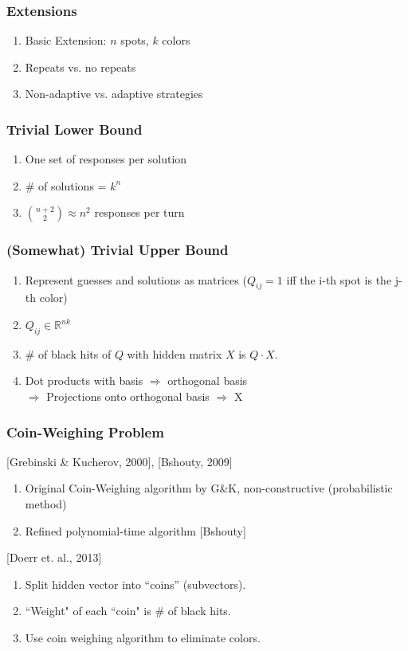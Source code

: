 \documentclass{beamer}
\begin{document}
    \begin{frame}
    	\frametitle{Extensions}
		\begin{enumerate}[label=\roman*.]
		\item Basic Extension: $n$ spots, $k$ colors
		\item Repeats vs. no repeats
		\item Non-adaptive vs. adaptive strategies
		\end{enumerate}
    \end{frame}
    
    \begin{frame}
    \frametitle{Trivial Lower Bound}
    \begin{enumerate}[label=\arabic*.]
	\item One set of responses per solution
	\item \# of solutions = $k^n$
	\item $\binom{n+2}{2} \approx n^2$ responses per turn \\
	\onslide<2->{$\Rightarrow \binom{n+2}{2}^s \geq k^n$}
    \end{enumerate}
    \end{frame}

    \begin{frame}
    \frametitle{(Somewhat) Trivial Upper Bound}
    \begin{enumerate}[label=\arabic*.]
	\item Represent guesses and solutions as matrices ($Q_{ij} = 1$ iff the i-th spot is the j-th color)
	\item $Q_{ij} \in \mathbb R^{nk}$
	\item \# of black hits of $Q$ with hidden matrix $X$ is  $Q\cdot X$.
	\item Dot products with basis $\Rightarrow$ orthogonal basis \\
	$\Rightarrow$ Projections onto orthogonal basis $\Rightarrow$ X
    \end{enumerate}
    \end{frame}

    \begin{frame}
    \frametitle{Coin-Weighing Problem}
    [Grebinski \& Kucherov, 2000], [Bshouty, 2009]
    \begin{enumerate}[label=\roman*.]
		\item Original Coin-Weighing algorithm by G\&K, non-constructive (probabilistic method)
		\item Refined polynomial-time algorithm [Bshouty]
	\end{enumerate}
    [Doerr et. al., 2013]
    	\begin{enumerate}[label=\roman*.]
		\item Split hidden vector into ``coins'' (subvectors).
		\item ``Weight" of each ``coin" is \# of black hits.
		\item Use coin weighing algorithm to eliminate colors.
		\end{enumerate}
    \end{frame}
\end{document}
